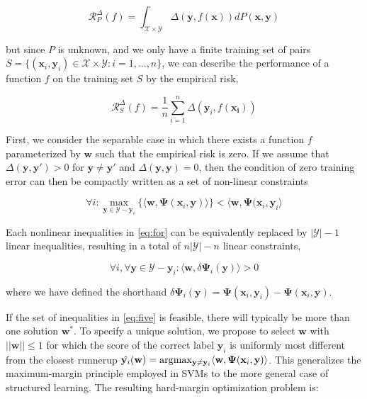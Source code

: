 \begin{equation}
\mathcal{R}^\Delta_P(f) = \int_{\mathcal{X} \times \mathcal{Y}} \Delta(\mathbf{y},f(\mathbf{x})) dP(\mathbf{x},\mathbf{y})
\end{equation}

but since $P$ is unknown, and we only have a finite training set of pairs $S = \{ (\mathbf{x}_i,\mathbf{y}_i) \in \mathcal{X}\times\mathcal{Y} : i=1,...,n\}$, we can describe the performance of a function $f$ on the training set $S$ by the empirical risk,

\begin{equation}
\mathcal{R}^\Delta_S(f) = \frac{1}{n} \sum_{i=1}^n \Delta(\mathbf{y}_i,f(\mathbf{x_i}))
\end{equation}

First, we consider the separable case in which there exists a function $f$ parameterized by $\mathbf{w}$ such that the empirical risk is zero. If we assume that $\Delta(\mathbf{y}, \mathbf{y'}) > 0$ for $\mathbf{y} \neq \mathbf{y'}$ and $\Delta(\mathbf{y}, \mathbf{y}) = 0$, then the condition of zero training error can then be compactly written as a set of non-linear constraints

\begin{equation}
\forall i: \max_{\mathbf{y} \in \mathcal{Y}-{\mathbf{y}_i}} \{ \langle \mathbf{w}, \mathbf{\Psi}(\mathbf{x}_i, \mathbf{y}) \rangle\} < \langle \mathbf{w}, \mathbf{\Psi}(\mathbf{x}_i,\mathbf{y}_i\rangle
\label{eq:for}
\end{equation}

Each nonlinear inequalities in \ref{eq:for} can be equivalently replaced by $|\mathcal{Y}|-1$ linear inequalities, resulting in a total of $n|\mathcal{Y}| -n$ linear constraints, 

\begin{equation}
\forall i, \forall \mathbf{y} \in \mathcal{Y}-\mathbf{y}_i: \langle \mathbf{w}, \delta\mathbf{\Psi}_i(\mathbf{y}) \rangle > 0
\label{eq:five}
\end{equation}

where we have defined the shorthand $\delta\mathbf{\Psi}_i(\mathbf{y}) =  \mathbf{\Psi}(\mathbf{x}_i, \mathbf{y}_i) -  \mathbf{\Psi}(\mathbf{x}_i, \mathbf{y})$.

If the set of inequalities in \ref{eq:five} is feasible, there will typically be more than one solution $\mathbf{w}^*$. To specify a unique solution, we propose to select $\mathbf{w}$ with $||\mathbf{w}||\leq 1$ for which the score of the correct label $\mathbf{y}_i$ is uniformly most different from the closest runnerup $\hat{\mathbf{y}_i}(\mathbf{w}) = \arg\!\max_{\mathbf{y} \neq \mathbf{y}_i} \langle \mathbf{w}, \mathbf{\Psi}(\mathbf{x}_i, \mathbf{y})\rangle$. This generalizes the maximum-margin principle employed in SVMs to the more general case of structured learning. The resulting hard-margin optimization problem is:

